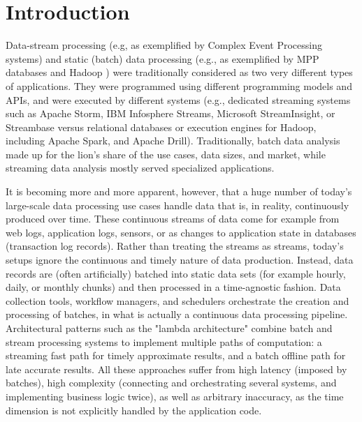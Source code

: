\documentclass[11pt]{article}
\begin{document}
\section{Introduction}
\label{sec:intro}
Data-stream processing (e.g, as exemplified by Complex Event Processing systems) and static (batch) data processing (e.g., as exemplified by MPP databases and Hadoop ) were traditionally considered as two very different types of applications. They were programmed using different programming models and APIs, and were executed by different systems (e.g., dedicated streaming systems such as  Apache Storm, IBM Infosphere Streams, Microsoft StreamInsight, or Streambase versus relational databases or execution engines for Hadoop, including Apache Spark, and Apache Drill). Traditionally, batch data analysis made up for the lion's share of the use cases, data sizes, and market, while streaming data analysis mostly served specialized applications.

It is becoming more and more apparent, however, that a huge number of today's large-scale data processing use cases handle data that is, in reality, continuously produced over time. These continuous streams of data come for example from web logs, application logs, sensors, or as changes to application state in databases (transaction log records). Rather than treating the streams as streams, today's setups ignore the continuous and timely nature of data production. Instead, data records are (often artificially) batched into static data sets (for example hourly, daily, or monthly chunks) and then processed in a time-agnostic fashion. Data collection tools, workflow managers, and schedulers orchestrate the creation and processing of batches, in what is actually a continuous data processing pipeline. Architectural patterns such as the "lambda architecture" \cite{marz2015big} combine batch and stream processing systems to implement multiple paths of computation: a streaming fast path for timely approximate results, and a batch offline path for late accurate results. All these approaches suffer from high latency (imposed by batches), high complexity (connecting and orchestrating several systems, and implementing business logic twice), as well as arbitrary inaccuracy, as the time dimension is not explicitly handled by the application code.
\end{document}
